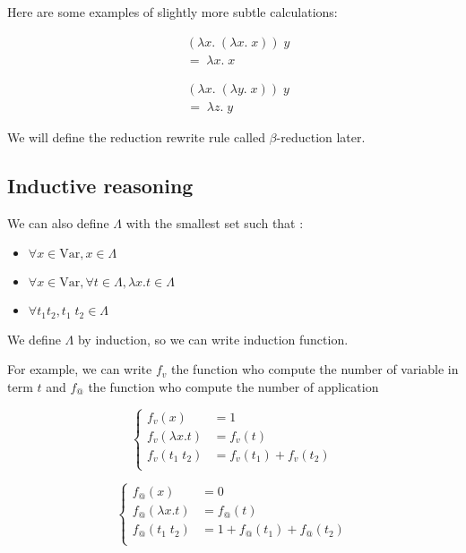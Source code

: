 \documentclass{article}
\theoremstyle{plain}
\theoremstyle{plain}
\begin{document}
  Here are some examples of slightly more subtle calculations:
  \begin{multicols}{2}
    \begin{align*}
      &(\lambda x.\; (\lambda x.\; x))\; y \\
      &=\; \lambda x.\; x
    \end{align*}

    \begin{align*}
      &(\lambda x.\; (\lambda y.\; x))\; y \\
      &=\; \lambda z.\; y
    \end{align*}
  \end{multicols}

  We will define the reduction rewrite rule called $\beta$-reduction later.

  \subsection{Inductive reasoning}

  We can also define $\Lambda$ with the smallest set such that :

  \begin{itemize}
    \item $\forall x \in \text{Var}, x \in \Lambda$
    \item $\forall x \in \text{Var}, \forall t \in \Lambda, \lambda x.t \in
      \Lambda$
    \item $\forall t_1 t_2, t_1\; t_2 \in \Lambda$
  \end{itemize}

  We define $\Lambda$ by induction, so we can write induction function.

  For example, we can write $f_v$ the function who compute the number of
  variable in term $t$ and $f_@$ the function who compute the number of
  application
  \begin{multicols}{2}
    \[
        \begin{cases}
            f_v(x) &= 1 \\
            f_v(\lambda x. t) &= f_v(t) \\
            f_v(t_1\; t_2) &= f_v(t_1) + f_v(t_2) \\
        \end{cases}
    \]

    \[
        \begin{cases}
            f_@(x) &= 0 \\
            f_@(\lambda x. t) &= f_@(t) \\
            f_@(t_1\; t_2) &= 1 + f_@(t_1) + f_@(t_2) \\
        \end{cases}
    \]
  \end{multicols}
\end{document}
